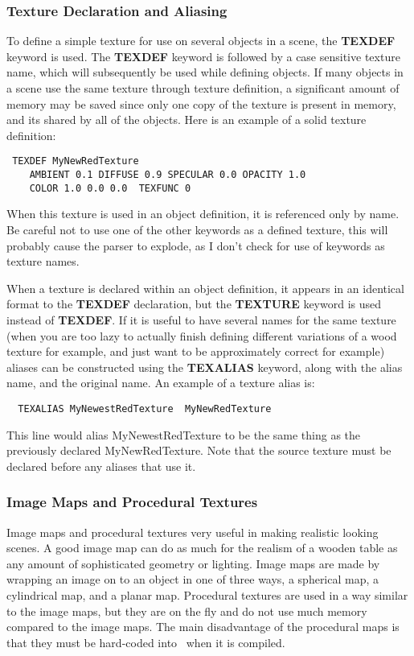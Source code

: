 \subsubsection{Texture Declaration and Aliasing}
  To define a simple texture for use on several objects in a scene, the 
{\bf TEXDEF} keyword is used.  The {\bf TEXDEF} keyword is followed by
a case sensitive texture name, which will subsequently be used while 
defining objects.  If many objects in a scene use the same texture through
texture definition, a significant amount of memory may be saved since only
one copy of the texture is present in memory, and its shared by all
of the objects.  Here is an example of a solid texture definition:
\begin{verbatim}
 TEXDEF MyNewRedTexture   
    AMBIENT 0.1 DIFFUSE 0.9 SPECULAR 0.0 OPACITY 1.0 
    COLOR 1.0 0.0 0.0  TEXFUNC 0
\end{verbatim}
When this texture is used in an object definition, it is referenced only by
name.  Be careful not to use one of the other keywords as a defined texture,
this will probably cause the parser to explode, as I don't check for use
of keywords as texture names. 

  When a texture is declared within an object definition, it appears in 
an identical format to the {\bf TEXDEF} declaration, but the {\bf TEXTURE} 
keyword is used instead of {\bf TEXDEF}.  If it is useful to have several
names for the same texture (when you are too lazy to actually finish defining
different variations of a wood texture for example, and just want to be 
approximately correct for example) aliases can be constructed using the 
{\bf TEXALIAS} keyword, along with the alias name, and the original name.
An example of a texture alias is:
\begin{verbatim}
  TEXALIAS MyNewestRedTexture  MyNewRedTexture
\end{verbatim}
This line would alias MyNewestRedTexture to be the same thing as the 
previously declared MyNewRedTexture.  Note that the source texture must
be declared before any aliases that use it.

\subsubsection{Image Maps and Procedural Textures}
  Image maps and procedural textures very useful in making realistic looking
scenes.  A good image map can do as much for the realism of a wooden table
as any amount of sophisticated geometry or lighting.  Image maps are made by
wrapping an image on to an object in one of three ways, a spherical map, a
cylindrical map, and a planar map.  Procedural textures are used in a way
similar to the image maps, but they are on the fly and do not use much memory
compared to the image maps.  The main disadvantage of the procedural maps
is that they must be hard-coded into \RAY\ when it is compiled.

